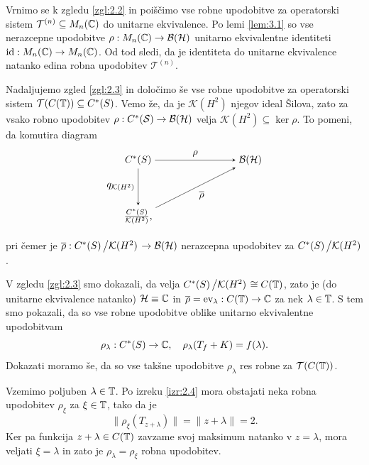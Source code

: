 \begin{zgled}
    Vrnimo se k zgledu \ref{zgl:2.2} in poiščimo vse robne upodobitve za operatorski sistem 
    $\mathcal{T}^{(n)} \subseteq M_n (\mathbb C)$ do unitarne ekvivalence. Po lemi \ref{lem:3.1} so vse nerazcepne upodobitve
    $\rho: M_n (\mathbb C) \to \operatorname{\mathcal{B} (\mathcal{H})}$ unitarno ekvivalentne identiteti $\operatorname{id}: M_n (\mathbb C) \to M_n (\mathbb C)$.
    Od tod sledi, da je identiteta do unitarne ekvivalence natanko edina robna upodobitev $\mathcal{T}^{(n)}$.
\end{zgled}

\begin{zgled}
    Nadaljujemo zgled \ref{zgl:2.3} in določimo še vse robne upodobitve za operatorski sistem 
    $\mathcal{T}(C(\mathbb T)) \subseteq C^*(S)$. Vemo že, da je $\mathcal{K}(H^2)$ njegov ideal Šilova,
    zato za vsako robno upodobitev $\rho: C^*(\mathcal{S}) \to \operatorname{\mathcal{B} (\mathcal{H})}$ velja $\mathcal{K}(H^2) \subseteq \ker \rho$.
    To pomeni, da komutira diagram 
    \begin{equation*}
        \begin{tikzpicture}[>=stealth, node distance=3cm]
    
            \node (S) at (0,2) {$C^*(S)$};
            \node (A) at (4,2) {$\bh$};
            \node (Q) at (0,0) {$\frac{C^*({S})}{\mathcal{K}(H^2)}$,};
            
            \draw[->]  (S) -- node[above] {$\rho$} (A);
            
            \draw[->] (S) -- node[left] {$q_{\mathcal{K}(H^2)}$} (Q);
            
            \draw[->] (Q) -- node[below right] {$\overline{\rho} $} (A);
            
        \end{tikzpicture}    
    \end{equation*}
    pri čemer je $\overline{\rho}: \quot{C^*({S})}{\mathcal{K}(H^2)} \to \bh$
    nerazcepna upodobitev za $\quot{C^*({S})}{\mathcal{K}(H^2)}$.
    
    V zgledu \ref{zgl:2.3} smo dokazali, da velja $\quot{C^*({S})}{\mathcal{K}(H^2)} \cong C(\T)$,
    zato je (do unitarne ekvivalence natanko) $\mathcal{H} \equiv \mathbb C$ in $\overline{\rho} = \operatorname{ev}_\lambda: C(\mathbb T) \to \mathbb C$ za nek $\lambda \in \mathbb T$.
    S tem smo pokazali, da so vse robne upodobitve oblike unitarno ekvivalentne upodobitvam 
    $$\rho_\lambda: C^*(S) \to \mathbb C,\quad \rho_\lambda(T_f + K) = f(\lambda).$$ 
    Dokazati moramo še, da so vse takšne upodobitve $\rho_\lambda$ res robne za $\mathcal{T}(C(\mathbb T))$.
    
    Vzemimo poljuben $\lambda \in \mathbb T$. Po izreku \ref{izr:2.4} mora obstajati neka robna upodobitev $\rho_\xi$ za $\xi \in \mathbb T$, tako da je
    $$\| \rho_\xi (T_{z + \lambda})\| = \| z + \lambda\| = 2.$$
    Ker pa funkcija $z + \lambda \in C(\mathbb T)$ zavzame svoj maksimum natanko v $z = \lambda$,
    mora veljati $\xi = \lambda$ in zato je $\rho_\lambda = \rho_\xi$ robna upodobitev.
\end{zgled}





